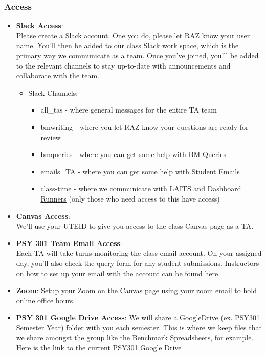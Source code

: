 \documentclass[
]{article}
\providecommand{\tightlist}{%
  \setlength{\itemsep}{0pt}\setlength{\parskip}{0pt}}
\begin{document}
\hypertarget{access}{%
\subsubsection{Access}\label{access}}

\begin{itemize}
\item
  \textbf{Slack Access}:\\
  Please create a Slack account. One you do, please let RAZ know your user name. You'll then be added to our class Slack work space, which is the primary way we communicate as a team. Once you've joined, you'll be added to the relevant channels to stay up-to-date with announcements and collaborate with the team.

  \begin{itemize}
  \tightlist
  \item
    Slack Channels:

    \begin{itemize}
    \tightlist
    \item
      all\_tas - where general messages for the entire TA team
    \item
      bmwriting - where you let RAZ know your questions are ready for review
    \item
      bmqueries - where you can get some help with \protect\hyperlink{benchmark-queries}{BM Queries}
    \item
      emails\_TA - where you can get some help with \protect\hyperlink{emails}{Student Emails}
    \item
      class-time - where we communicate with LAITS and \protect\hyperlink{dashboard-runner}{Dashboard Runners} (only those who need access to this have access)
    \end{itemize}
  \end{itemize}
\item
  \textbf{Canvas Access}:\\
  We'll use your UTEID to give you access to the class Canvas page as a TA.
\item
  \textbf{PSY 301 Team Email Access}:\\
  Each TA will take turns monitoring the class email account. On your assigned day, you'll also check the query form for any student submissions. Instructors on how to set up your email with the account can be found \protect\hyperlink{setting-up-your-account}{here}.
\item
  \textbf{Zoom}:
  Setup your Zoom on the Canvas page using your zoom email to hold online office hours.
\item
  \textbf{PSY 301 Google Drive Access}:
  We will share a GoogleDrive (ex. PSY301 Semester Year) folder with you each semester. This is where we keep files that we share amongst the group like the Benchmark Spreadsheets, for example. Here is the link to the current \href{https://drive.google.com/drive/folders/1OR_QPA95Tad98s0cVwOrGnzc3gzAihCH?usp=drive_link}{PSY301 Google Drive}
\end{itemize}
\end{document}
